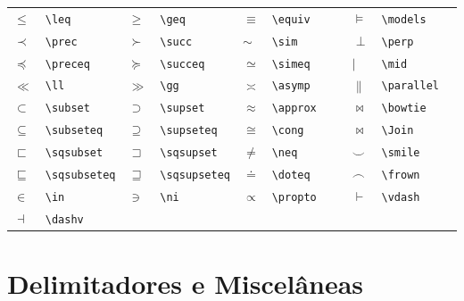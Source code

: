 \documentclass[fleqn]{profmat-cefet}
\begin{document}
\begin{spacing}{1}
\begin{longtable}{p{4mm}p{28mm}p{4mm}p{28mm}p{4mm}p{28mm}p{4mm}p{24mm}} \hline
  $\leq       $ & \lstinline!\leq       ! &
  $\geq       $ & \lstinline!\geq       ! &
  $\equiv     $ & \lstinline!\equiv     ! &
  $\models    $ & \lstinline!\models    ! \\
  $\prec      $ & \lstinline!\prec      ! &
  $\succ      $ & \lstinline!\succ      ! &
  $\sim       $ & \lstinline!\sim       ! &
  $\perp      $ & \lstinline!\perp      ! \\
  $\preceq    $ & \lstinline!\preceq    ! &
  $\succeq    $ & \lstinline!\succeq    ! &
  $\simeq     $ & \lstinline!\simeq     ! &
  $\mid       $ & \lstinline!\mid       ! \\
  $\ll        $ & \lstinline!\ll        ! &
  $\gg        $ & \lstinline!\gg        ! &
  $\asymp     $ & \lstinline!\asymp     ! &
  $\parallel  $ & \lstinline!\parallel  ! \\
  $\subset    $ & \lstinline!\subset    ! &
  $\supset    $ & \lstinline!\supset    ! &
  $\approx    $ & \lstinline!\approx    ! &
  $\bowtie    $ & \lstinline!\bowtie    ! \\
  $\subseteq  $ & \lstinline!\subseteq  ! &
  $\supseteq  $ & \lstinline!\supseteq  ! &
  $\cong      $ & \lstinline!\cong      ! &
  $\Join      $ & \lstinline!\Join      ! \\
  $\sqsubset  $ & \lstinline!\sqsubset  ! &
  $\sqsupset  $ & \lstinline!\sqsupset  ! &
  $\neq       $ & \lstinline!\neq       ! &
  $\smile     $ & \lstinline!\smile     ! \\
  $\sqsubseteq$ & \lstinline!\sqsubseteq! &
  $\sqsupseteq$ & \lstinline!\sqsupseteq! &
  $\doteq     $ & \lstinline!\doteq     ! &
  $\frown     $ & \lstinline!\frown     ! \\
  $\in        $ & \lstinline!\in        ! &
  $\ni        $ & \lstinline!\ni        ! &
  $\propto    $ & \lstinline!\propto    ! &
  $\vdash     $ & \lstinline!\vdash     ! \\
  $\dashv     $ & \lstinline!\dashv     ! \\ \hline
\end{longtable}

\section{Delimitadores e Miscelâneas}


\end{spacing}
\end{document}
